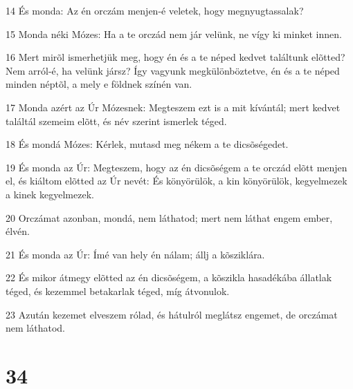 \par 14 És monda: Az én orczám menjen-é veletek, hogy megnyugtassalak?
\par 15 Monda néki Mózes: Ha a te orczád nem jár velünk, ne vígy ki minket innen.
\par 16 Mert mirõl ismerhetjük meg, hogy én és a te néped kedvet találtunk elõtted? Nem arról-é, ha velünk jársz? Így vagyunk megkülönböztetve, én és a te néped minden néptõl, a mely e földnek színén van.
\par 17 Monda azért az Úr Mózesnek: Megteszem ezt is a mit kívántál; mert kedvet találtál szemeim elõtt, és név szerint ismerlek téged.
\par 18 És mondá Mózes: Kérlek, mutasd meg nékem a te dicsõségedet.
\par 19 És monda az Úr: Megteszem, hogy az én dicsõségem a te orczád elõtt menjen el, és kiáltom elõtted az Úr nevét: És könyörülök, a kin könyörülök, kegyelmezek a kinek kegyelmezek.
\par 20 Orczámat azonban, mondá, nem láthatod; mert nem láthat engem ember, élvén.
\par 21 És monda az Úr: Ímé van hely én nálam; állj a kõsziklára.
\par 22 És mikor átmegy elõtted az én dicsõségem, a kõszikla hasadékába állatlak téged, és kezemmel betakarlak téged, míg átvonulok.
\par 23 Azután kezemet elveszem rólad, és hátulról meglátsz engemet, de orczámat nem láthatod.

\chapter{34}

